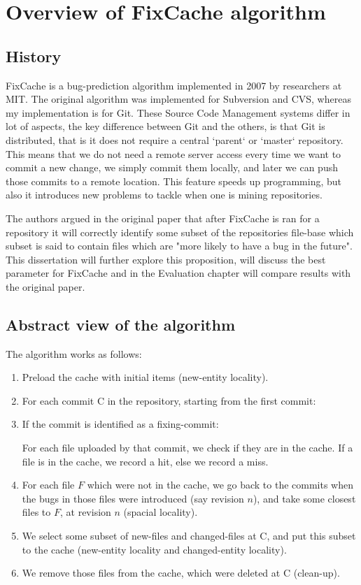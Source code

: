 \documentclass[12pt,twoside,notitlepage]{report}
\newcommand{\fxch}{FixCache}
\begin{document}
\section{Overview of \fxch{} algorithm}
\subsection{History}
\fxch{} is a bug-prediction algorithm implemented in 2007 by researchers at MIT\cite{FixCache}. The original algorithm was implemented for Subversion and CVS, whereas my implementation is for Git. These Source Code Management systems differ in lot of aspects, the key difference between Git and the others, is that Git is distributed, that is it does not require a central `parent` or `master` repository. This means that we do not need a remote server access every time we want to commit a new change, we simply commit them locally, and later we can push those commits to a remote location. This feature speeds up programming, but also it introduces new problems to tackle when one is mining repositories\cite{Git}.

The authors argued in the original paper that after \fxch{} is ran for a repository it will correctly identify some subset of the repositories file-base which subset is said to contain files which are "more likely to have a bug in the future". This dissertation will further explore this proposition, will discuss the best parameter for \fxch{} and in the Evaluation chapter will compare results with the original paper.
\subsection{Abstract view of the algorithm}
The algorithm works as follows:
\begin{enumerate}
	\item Preload the cache with initial items (new-entity locality).
	\item For each commit C in the repository, starting from the first commit:
	\item If the commit is identified as a fixing-commit:
		
	For each file uploaded by that commit, we check if they are in the cache. If a file is in the cache, we record a hit, else we record a miss.
	\item For each file $F$ which were not in the cache, we go back to the commits when the bugs in those files were introduced (say revision $n$), and take some closest files to $F$, at revision $n$ (spacial locality).
	\item We select some subset of new-files and changed-files at C, and put this subset to the cache (new-entity locality and changed-entity locality).
	\item We remove those files from the cache, which were deleted at C (clean-up).
\end{enumerate}
\end{document}
